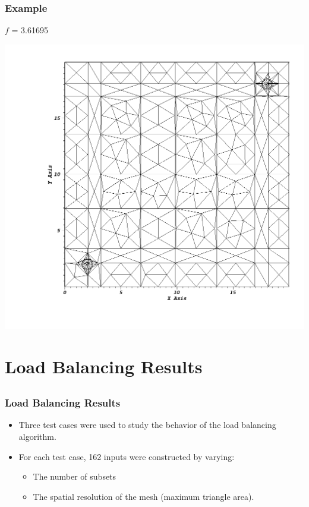 \documentclass[]{beamer}
\begin{document}
\begin{frame}[t]\frametitle{Example}
\begin{minipage}{0.15\textwidth}
\begin{footnotesize}
$f$ = 3.61695
\end{footnotesize}
\end{minipage}
\begin{minipage}{0.8\textwidth}
\centering
\includegraphics[scale = 0.22]{figures/redistribute_after.png}
\end{minipage}
\end{frame}

\section{Load Balancing Results}
\subsection{}
\begin{frame}[t]\frametitle{Load Balancing Results}
\begin{block}{}
\begin{itemize}
	\item Three test cases were used to study the behavior of the load balancing algorithm.
	\item For each test case, 162 inputs were constructed by varying:
		\begin{itemize}
		\item The number of subsets
		\item The spatial resolution of the mesh (maximum triangle area).
		\end{itemize}
\end{itemize}
\end{block}
\end{frame}
\end{document}
